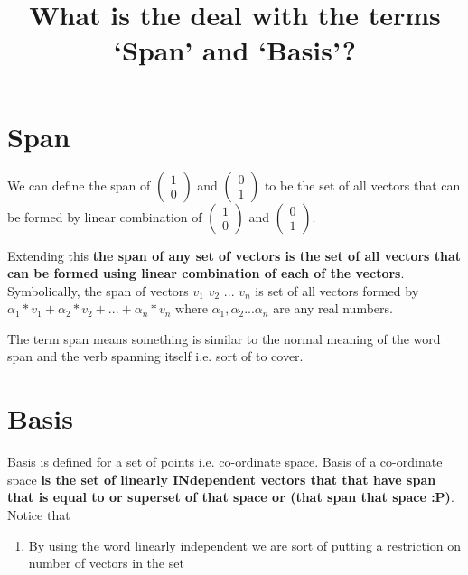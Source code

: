 \documentclass[12pt]{article}
\title{What is the deal with the terms `Span' and `Basis'?}
\author{}
\date{}
\newcommand{\comment}[1]{}
\begin{document}
\maketitle

\section{Span}
We can define the span of $ \comment{column vector: 1, 0} \begin{pmatrix}1 \\  0\end{pmatrix}  $ and $ \comment{column vector: 0, 1} \begin{pmatrix} 0 \\  1 \end{pmatrix} $ to be the set of all vectors that can be formed by linear combination of $ \comment{column vector: 1, 0} \begin{pmatrix}1 \\  0\end{pmatrix}  $ and $ \comment{column vector: 0, 1} \begin{pmatrix} 0 \\  1 \end{pmatrix} $.

Extending this \textbf{the span of any set of vectors is the set of all vectors that can be formed using linear combination of each of the vectors}. Symbolically, the span of vectors $ v_1 $ $ v_2 $ ... $ v_n $ is set of all vectors formed by $ \alpha_1 * v_1 + \alpha_2 * v_2 + ... + \alpha_n * v_n $ where $ \alpha_1, \alpha_2 ... \alpha_n $ are any real numbers.

The term span means something is similar to the normal meaning of the word span and the verb spanning itself i.e. sort of to cover.

\section{Basis}
Basis is defined for a set of points i.e. co-ordinate space. Basis of a co-ordinate space \textbf{is the set of linearly INdependent vectors that that have span that is equal to or superset of that space or (that span that space :P)}. Notice that
\begin{enumerate}
  \item By using the word linearly independent we are sort of putting a restriction on number of vectors in the set
\end{enumerate}
\end{document}
